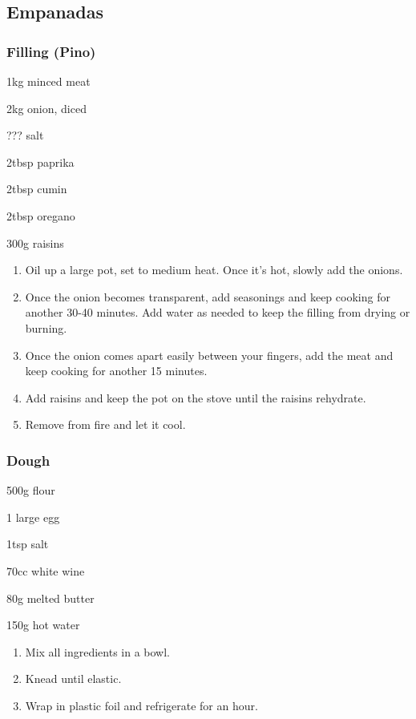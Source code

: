 \subsection{Empanadas}
\subsubsection{Filling (Pino)}
\begin{ingredients}
	\item 1kg minced meat
	\item 2kg onion, diced
	\item ??? salt
	\item 2tbsp paprika
	\item 2tbsp cumin
	\item 2tbsp oregano
	\item 300g raisins
\end{ingredients}
\begin{enumerate}
	\item Oil up a large pot, set to medium heat. Once it's hot, slowly add the onions.
	\item Once the onion becomes transparent, add seasonings and keep cooking for another 30-40 minutes. Add water as needed to keep the filling from drying or burning.
	\item Once the onion comes apart easily between your fingers, add the meat and keep cooking for another 15 minutes.
	\item Add raisins and keep the pot on the stove until the raisins rehydrate.
	\item Remove from fire and let it cool.
\end{enumerate}
\subsubsection{Dough}
\begin{ingredients}
	\item 500g flour
	\item 1 large egg
	\item 1tsp salt
	\item 70cc white wine
	\item 80g melted butter
	\item 150g hot water
\end{ingredients}
\begin{enumerate}
	\item Mix all ingredients in a bowl.
	\item Knead until elastic.
	\item Wrap in plastic foil and refrigerate for an hour.
\end{enumerate}
